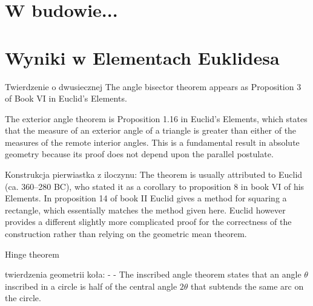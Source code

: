 \documentclass{parchment}
\begin{document}



\chapter{W budowie...}














\chapter{Wyniki w Elementach Euklidesa}


Twierdzenie o dwusiecznej %
The angle bisector theorem appears as Proposition 3 of Book VI in Euclid's Elements. 

The exterior angle theorem is Proposition 1.16 in Euclid's Elements, which states that the measure of an exterior angle of a triangle is greater than either of the measures of the remote interior angles. This is a fundamental result in absolute geometry because its proof does not depend upon the parallel postulate. %

Konstrukcja pierwiastka z iloczynu:
The theorem is usually attributed to Euclid (ca. 360–280 BC), who stated it as a corollary to proposition 8 in book VI of his Elements. In proposition 14 of book II Euclid gives a method for squaring a rectangle, which essentially matches the method given here. Euclid however provides a different slightly more complicated proof for the correctness of the construction rather than relying on the geometric mean theorem.


Hinge theorem %

twierdzenia geometrii koła:
- %
- The inscribed angle theorem states that an angle $\theta$ inscribed in a circle is half of the central angle $2\theta$ that subtends the same arc on the circle. 


\end{document}
